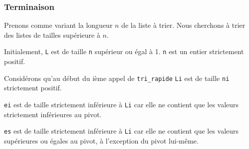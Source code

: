 


%

%
%
%
\subsubsection{Terminaison}

Prenons comme variant la longueur $n$ de la liste à trier.  Nous cherchons à trier des listes de tailles supérieure à $n$. 

Initialement, \texttt{L} est de taille \texttt{n} supérieur ou égal à 1. \texttt{n} est un entier strictement positif. 

Considérons qu'au début du ième appel de \texttt{tri\_rapide} \texttt{Li} est de taille \texttt{ni} strictement positif.

\texttt{ei} est de taille strictement inférieure à \texttt{Li} car elle ne contient que les valeurs strictement inférieures au pivot.  

\texttt{es} est de taille strictement inférieure à \texttt{Li} car elle ne contient que les valeurs supérieures ou égales au pivot, à l'exception du pivot lui-même. 

